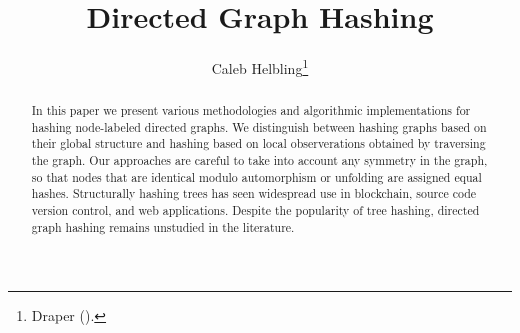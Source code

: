 \documentclass[twoside,leqno]{article}
\begin{document}
%
\newcommand\relatedversion{}

\title{\Large Directed Graph Hashing\relatedversion}
    \author{Caleb Helbling\thanks{Draper ().}}

\date{}

\maketitle







\begin{abstract}
  In this paper we present various methodologies and algorithmic implementations for hashing node-labeled directed graphs. We distinguish between hashing graphs based on their global structure and hashing based on local observerations obtained by traversing the graph. Our approaches are careful to take into account any symmetry in the graph, so that nodes that are identical modulo automorphism or unfolding are assigned equal hashes. Structurally hashing trees has seen widespread use in blockchain, source code version control, and web applications. Despite the popularity of tree hashing, directed graph hashing remains unstudied in the literature.
\end{abstract}
\end{document}
